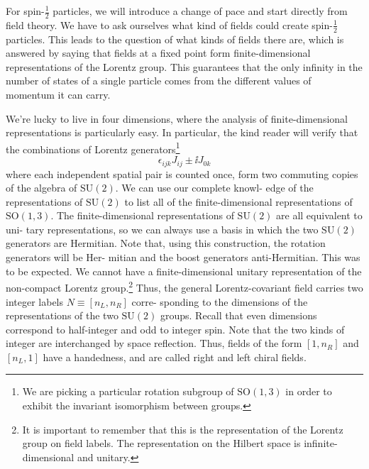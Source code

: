 
For spin-$\frac12$ particles, we will introduce a change of pace and start directly from field
theory. We have to ask ourselves what kind of fields could create spin-$\frac12$ particles. This
leads to the question of what kinds of fields there are, which is answered by saying that
fields at a fixed point form finite-dimensional representations of the Lorentz group.
This guarantees that the only infinity in the number of states of a single particle comes
from the different values of momentum it can carry.

We’re lucky to live in four dimensions, where the analysis of finite-dimensional
representations is particularly easy. In particular, the kind reader will verify that the
combinations of Lorentz generators\footnote[1]{We are picking a particular rotation subgroup of $\mathrm{SO}(1,3)$ in order to exhibit the invariant isomorphism between groups.}
\begin{equation*}
  \epsilon_{ijk}J_{ij}\pm\ii J_{0k}
\end{equation*}
where each independent spatial pair is counted once, form two commuting copies of the algebra of $\mathrm{SU}(2)$. We can use our complete knowl-
edge of the representations of $\mathrm{SU}(2)$ to list all of the finite-dimensional representations
of $\mathrm{SO}(1,3)$. The finite-dimensional representations of $\mathrm{SU}(2)$ are all equivalent to uni-
tary representations, so we can always use a basis in which the two $\mathrm{SU}(2)$ generators
are Hermitian. Note that, using this construction, the rotation generators will be Her-
mitian and the boost generators anti-Hermitian. This was to be expected. We cannot
have a finite-dimensional unitary representation of the non-compact Lorentz group.\footnote[2]{It is important to remember that this is the representation of the Lorentz group on field labels. The representation on the Hilbert space is infinite-dimensional and unitary.}
Thus, the general Lorentz-covariant field carries two integer labels $N\equiv[n_L,n_R]$ corre-
sponding to the dimensions of the representations of the two $\mathrm{SU}(2)$ groups. Recall that
even dimensions correspond to half-integer and odd to integer spin. Note that the two
kinds of integer are interchanged by space reflection. Thus, fields of the form $[1,n_R]$
and $[n_L,1]$ have a handedness, and are called right and left chiral fields.

